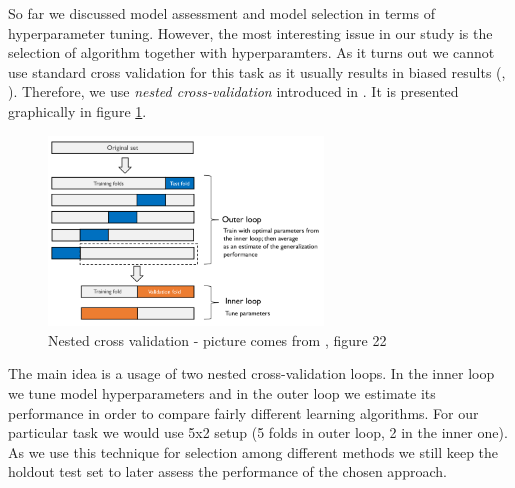 \documentclass[12pt, wide]{mwart}
\begin{document}
So far we discussed model assessment and model selection in terms of hyperparameter tuning. However, the most interesting issue in our study is the selection of algorithm together with hyperparamters. As it turns out we cannot use standard cross validation for this task as it usually results in biased results (\cite{ModelSelection}, \cite{cvOverfit}). Therefore, we use \textit{nested cross-validation} introduced in \cite{nestedCV}. It is presented graphically in figure \ref{fig:nestedCV}.

\begin{figure}
\centering
\includegraphics[width=0.65\textwidth]{images/nestedCV.png}
\caption{Nested cross validation - picture comes from \cite{ModelSelection}, figure 22}
\label{fig:nestedCV}
\end{figure}

The main idea is a usage of two nested cross-validation loops. In the inner loop we tune model hyperparameters and in the outer loop we estimate its performance in order to compare fairly different learning algorithms. For our particular task we would use 5x2 setup (5 folds in outer loop, 2 in the inner one). As we use this technique for selection among different methods we still keep the holdout test set to later assess the performance of the chosen approach.
\end{document}
